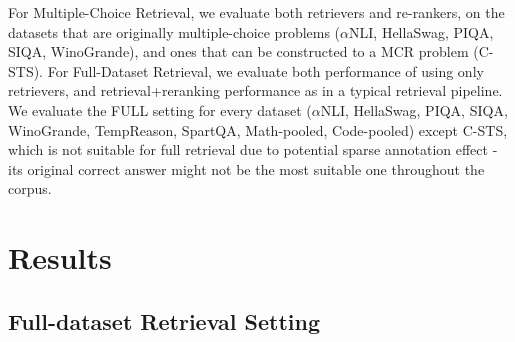 \documentclass{article} %
\begin{document}
For Multiple-Choice Retrieval, we evaluate both retrievers and re-rankers, on the datasets that are originally multiple-choice problems ($\alpha$NLI, HellaSwag, PIQA, SIQA, WinoGrande), and ones that can be constructed to a MCR problem (C-STS). For Full-Dataset Retrieval, we evaluate both performance of using only retrievers, and retrieval+reranking performance as in a typical retrieval pipeline. We evaluate the FULL setting for every dataset ($\alpha$NLI, HellaSwag, PIQA, SIQA, WinoGrande, TempReason, SpartQA, Math-pooled, Code-pooled) except C-STS, which is not suitable for full retrieval due to potential sparse annotation effect - its original correct answer might not be the most suitable one throughout the corpus.


\section{Results}


\subsection{Full-dataset Retrieval Setting}





% 
\end{document}
